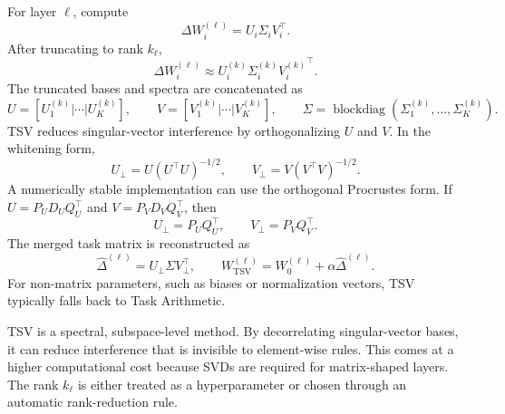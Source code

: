 \documentclass[11pt, a4paper]{utda}
\theoremstyle{plain}
\theoremstyle{definition}
\theoremstyle{remark}
\providecommand{\TSV}{\mathrm{TSV}}
\providecommand{\blockdiag}{\operatorname{blockdiag}}
\begin{document}
For layer $\ell$, compute
\begin{equation}
    \Delta W_i^{(\ell)}=U_i\Sigma_iV_i^\top.
\end{equation}
After truncating to rank $k_\ell$,
\begin{equation}
    \Delta W_i^{(\ell)} \approx
    U_i^{(k)}\Sigma_i^{(k)}{V_i^{(k)}}^\top.
\end{equation}
The truncated bases and spectra are concatenated as
\begin{equation}
    U=[U_1^{(k)}|\cdots|U_K^{(k)}],\qquad
    V=[V_1^{(k)}|\cdots|V_K^{(k)}],\qquad
    \Sigma=\blockdiag(\Sigma_1^{(k)},\ldots,\Sigma_K^{(k)}).
\end{equation}
TSV reduces singular-vector interference by orthogonalizing $U$ and $V$. In the
whitening form,
\begin{equation}
    U_\perp = U(U^\top U)^{-1/2},
    \qquad
    V_\perp = V(V^\top V)^{-1/2}.
\end{equation}
A numerically stable implementation can use the orthogonal Procrustes form. If
$U=P_U D_U Q_U^\top$ and $V=P_V D_V Q_V^\top$, then
\begin{equation}
    U_\perp=P_UQ_U^\top,
    \qquad
    V_\perp=P_VQ_V^\top.
\end{equation}
The merged task matrix is reconstructed as
\begin{equation}
    \widehat{\Delta}^{(\ell)}=U_\perp\Sigma V_\perp^\top,
    \qquad
    W_{\TSV}^{(\ell)}=W_0^{(\ell)}+\alpha\widehat{\Delta}^{(\ell)}.
\end{equation}
For non-matrix parameters, such as biases or normalization vectors, TSV typically
falls back to Task Arithmetic.

TSV is a spectral, subspace-level method. By decorrelating singular-vector bases,
it can reduce interference that is invisible to element-wise rules. This comes at
a higher computational cost because SVDs are required for matrix-shaped layers.
The rank $k_\ell$ is either treated as a hyperparameter or chosen through an
automatic rank-reduction rule.
\end{document}
